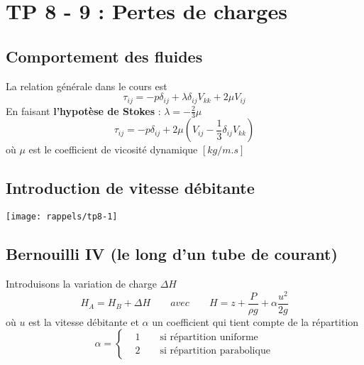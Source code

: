 
\section*{TP 8 - 9 : Pertes de charges}
\subsection*{Comportement des fluides}
La relation générale dans le cours est
\begin{equation}
	\tau _{ij} = -p\delta _{ij}+\lambda \delta _{ij} V_{kk} +2\mu V_{ij}
\end{equation}
En faisant \textbf{l'hypotèse de Stokes} : $\lambda = -\frac{2}{3}\mu$
\begin{equation}
	\tau _{ij} = -p\delta _{ij}+2\mu (V_{ij} -\frac{1}{3} \delta_{ij}V_{kk})
\end{equation}
où $\mu$ est le coefficient de vicosité dynamique $[kg/m.s]$

\subsection*{Introduction de vitesse débitante}
\begin{center}
\texttt{[image: rappels/tp8-1]}
\end{center}

\subsection*{Bernouilli IV (le long d'un tube de courant)}
Introduisons la variation de charge $\Delta H$
\begin{equation}
	H_A = H_B + \Delta H \qquad avec \qquad H= z+\frac{P}{\rho g}+\alpha \frac{u^2}{2g}
\end{equation}
où $u$ est la vitesse débitante et $\alpha$ un coefficient qui tient compte de la répartition 
\begin{equation}
	\alpha = 
	\left\{
	\begin{aligned}
	&1 \qquad \mbox{si répartition uniforme}\\
	&2 \qquad \mbox{si répartition parabolique}
	\end{aligned}
	\right.
\end{equation}

